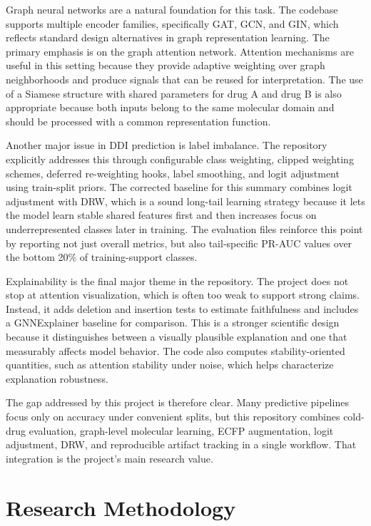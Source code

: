 \documentclass[12pt,a4paper]{report}
\begin{document}
Graph neural networks are a natural foundation for this task. The codebase supports multiple encoder families, specifically GAT, GCN, and GIN, which reflects standard design alternatives in graph representation learning. The primary emphasis is on the graph attention network. Attention mechanisms are useful in this setting because they provide adaptive weighting over graph neighborhoods and produce signals that can be reused for interpretation. The use of a Siamese structure with shared parameters for drug A and drug B is also appropriate because both inputs belong to the same molecular domain and should be processed with a common representation function.

Another major issue in DDI prediction is label imbalance. The repository explicitly addresses this through configurable class weighting, clipped weighting schemes, deferred re-weighting hooks, label smoothing, and logit adjustment using train-split priors. The corrected baseline for this summary combines logit adjustment with DRW, which is a sound long-tail learning strategy because it lets the model learn stable shared features first and then increases focus on underrepresented classes later in training. The evaluation files reinforce this point by reporting not just overall metrics, but also tail-specific PR-AUC values over the bottom 20\% of training-support classes.

Explainability is the final major theme in the repository. The project does not stop at attention visualization, which is often too weak to support strong claims. Instead, it adds deletion and insertion tests to estimate faithfulness and includes a GNNExplainer baseline for comparison. This is a stronger scientific design because it distinguishes between a visually plausible explanation and one that measurably affects model behavior. The code also computes stability-oriented quantities, such as attention stability under noise, which helps characterize explanation robustness.

The gap addressed by this project is therefore clear. Many predictive pipelines focus only on accuracy under convenient splits, but this repository combines cold-drug evaluation, graph-level molecular learning, ECFP augmentation, logit adjustment, DRW, and reproducible artifact tracking in a single workflow. That integration is the project's main research value.

\chapter{Research Methodology}
\end{document}
